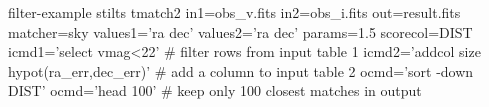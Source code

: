 \documentclass[20pt,landscape]{foils}
\begin{document}
\newcommand{\ca}[1]{{\color{darkgreen}#1}}
\newcommand{\cb}[1]{{\color{teal}#1}}
\newcommand{\cc}[1]{{\color{hotpink}#1}}
\newcommand{\ccomm}[1]{{\color{black}#1}}
\begin{SaveVerbatim}[commandchars=\\\{\}]{filter-example}
stilts tmatch2 \ca{in1=obs_v.fits} \cb{in2=obs_i.fits} \cc{out=result.fits}
               matcher=sky values1='ra dec' values2='ra dec' params=1.5
               scorecol=DIST
               \ca{icmd1='select vmag<22'}                    \ccomm{# filter rows from input table 1}
               \cb{icmd2='addcol size hypot(ra_err,dec_err)'} \ccomm{# add a column to input table 2}
               \cc{ocmd='sort -down DIST' ocmd='head 100'}    \ccomm{# keep only 100 closest matches in output}
\end{SaveVerbatim}

\end{document}
